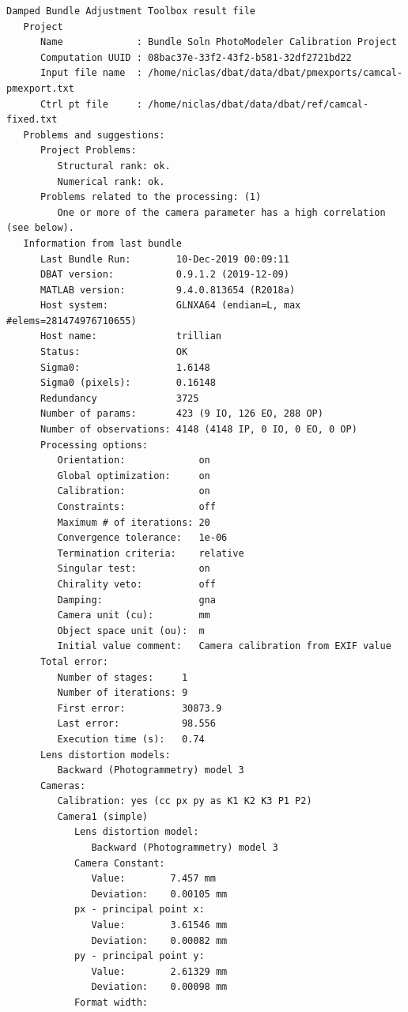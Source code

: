 \documentclass{article}
\begin{document}
\begin{verbatim}
Damped Bundle Adjustment Toolbox result file
   Project
      Name             : Bundle Soln PhotoModeler Calibration Project
      Computation UUID : 08bac37e-33f2-43f2-b581-32df2721bd22
      Input file name  : /home/niclas/dbat/data/dbat/pmexports/camcal-pmexport.txt
      Ctrl pt file     : /home/niclas/dbat/data/dbat/ref/camcal-fixed.txt
   Problems and suggestions:
      Project Problems:
         Structural rank: ok.
         Numerical rank: ok.
      Problems related to the processing: (1)
         One or more of the camera parameter has a high correlation (see below).
   Information from last bundle
      Last Bundle Run:        10-Dec-2019 00:09:11
      DBAT version:           0.9.1.2 (2019-12-09)
      MATLAB version:         9.4.0.813654 (R2018a)
      Host system:            GLNXA64 (endian=L, max #elems=281474976710655)
      Host name:              trillian
      Status:                 OK
      Sigma0:                 1.6148
      Sigma0 (pixels):        0.16148
      Redundancy              3725
      Number of params:       423 (9 IO, 126 EO, 288 OP)
      Number of observations: 4148 (4148 IP, 0 IO, 0 EO, 0 OP)
      Processing options:
         Orientation:             on
         Global optimization:     on
         Calibration:             on
         Constraints:             off
         Maximum # of iterations: 20
         Convergence tolerance:   1e-06
         Termination criteria:    relative
         Singular test:           on
         Chirality veto:          off
         Damping:                 gna
         Camera unit (cu):        mm
         Object space unit (ou):  m
         Initial value comment:   Camera calibration from EXIF value
      Total error:
         Number of stages:     1
         Number of iterations: 9
         First error:          30873.9
         Last error:           98.556
         Execution time (s):   0.74
      Lens distortion models:
         Backward (Photogrammetry) model 3
      Cameras:
         Calibration: yes (cc px py as K1 K2 K3 P1 P2)
         Camera1 (simple)
            Lens distortion model:
               Backward (Photogrammetry) model 3
            Camera Constant:
               Value:        7.457 mm
               Deviation:    0.00105 mm
            px - principal point x:
               Value:        3.61546 mm
               Deviation:    0.00082 mm
            py - principal point y:
               Value:        2.61329 mm
               Deviation:    0.00098 mm
            Format width:

\end{verbatim}
\end{document}
